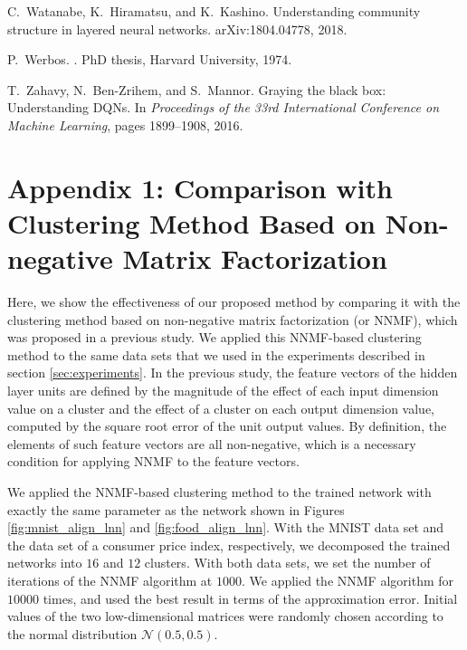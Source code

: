 \documentclass{article}
\begin{document}
\begin{thebibliography}{10}
C.~Watanabe, K.~Hiramatsu, and K.~Kashino.
\newblock Understanding community structure in layered neural networks.
\newblock arXiv:1804.04778, 2018.

P.~Werbos.
.
\newblock PhD thesis, Harvard University, 1974.

T.~Zahavy, N.~Ben-Zrihem, and S.~Mannor.
\newblock Graying the black box: Understanding {DQN}s.
\newblock In {\em Proceedings of the 33rd International Conference on Machine
  Learning}, pages 1899--1908, 2016.

\end{thebibliography}




\clearpage
\section*{Appendix 1: Comparison with Clustering Method Based on Non-negative Matrix Factorization}

Here, we show the effectiveness of our proposed method by comparing it with the clustering method based on non-negative matrix factorization (or NNMF), which was proposed in a previous study\cite{Watanabe2018arxiv2}. We applied this NNMF-based clustering method to the same data sets that we used in the experiments described in section \ref{sec:experiments}. 
In the previous study\cite{Watanabe2018arxiv2}, the feature vectors of the hidden layer units are defined by the magnitude of the effect of each input dimension value on a cluster and the effect of a cluster on each output dimension value, computed by the square root error of the unit output values. By definition, the elements of such feature vectors are all non-negative, which is a necessary condition for applying NNMF to the feature vectors. 

We applied the NNMF-based clustering method to the trained network with exactly the same parameter as the network shown in Figures \ref{fig:mnist_align_lnn} and \ref{fig:food_align_lnn}. With the MNIST data set\cite{LeCun1998} and the data set of a consumer price index\cite{estat}, respectively, we decomposed the trained networks into $16$ and $12$ clusters. 
With both data sets, we set the number of iterations of the NNMF algorithm at $1000$. We applied the NNMF algorithm for $10000$ times, and used the best result in terms of the approximation error. Initial values of the two low-dimensional matrices were randomly chosen according to the normal distribution $\mathcal{N}(0.5,0.5)$. 
\end{document}
